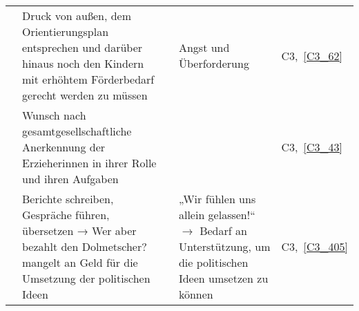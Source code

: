 \begin{landscape}
\begin{small}
\begin{centering}
\begin{longtable}{p{2cm}p{8.5cm}p{4cm}p{4cm}p{1.5cm}}
\cmidrule{2 - 5}
& Druck von außen, dem Orientierungsplan entsprechen und darüber hinaus noch den Kindern mit erhöhtem Förderbedarf gerecht werden zu müssen & & Angst und Überforderung & C3,~\ref{C3_62}\\
\cmidrule{2 - 5} 
& Wunsch nach gesamtgesellschaftliche Anerkennung der Erzieherinnen in ihrer Rolle und ihren Aufgaben  & & & C3,~\ref{C3_43}\\ 
\cmidrule{2 - 5}
& Berichte schreiben, Gespräche führen, übersetzen → Wer aber bezahlt den Dolmetscher? mangelt an Geld für die Umsetzung der politischen Ideen & & „Wir fühlen uns allein gelassen!“ $\rightarrow$ Bedarf an Unterstützung, um die politischen Ideen umsetzen zu können\vspace{0.5em}& C3,~\ref{C3_405}\\


\end{longtable}
\end{centering}
\end{small}
\end{landscape}
